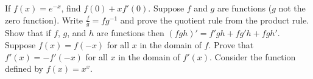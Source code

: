 \begin{questions}
\begin{multicols}{2}
    \end{multicols}
  \questioA If $ f(x) = e^{-x} $, find $ f(0) + xf'(0) $.
  \questioM Suppose $ f $ and $ g $ are functions ($ g $ not the zero function). Write $ \frac{f}{g} = fg^{-1} $ and
            prove the quotient rule from the product rule.
  \questioM Show that if $ f $, $ g $, and $ h $ are functions then $ (fgh)' = f'gh + fg'h + fgh' $.
  \questioE Suppose $ f(x) = f(-x) $ for all $ x $ in the domain of $ f $. Prove that $ f'(x) = -f'(-x) $ for all $ x $
            in the domain of $ f'(x) $.
  \questioE Consider the function defined by $ f(x) = x^x $.
\end{questions}
